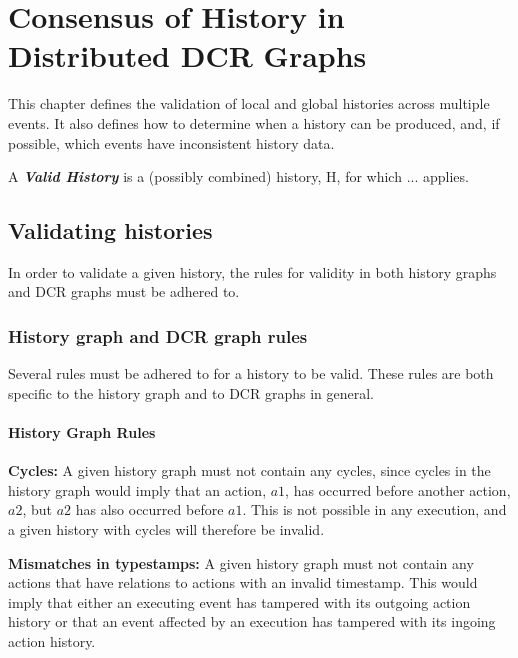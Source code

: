 \chapter{Consensus of History in Distributed DCR Graphs}
\label{chap:consensusindcr}
	This chapter defines the validation of local and global histories across multiple events. It also defines how to determine when a history can be produced, and, if possible, which events have inconsistent history data.
	 
	\begin{definition}
		A \textit{\textbf{Valid History}} is a (possibly combined) history, H, for which ... applies. 
	\end{definition}
	
	\section{Validating histories}
	In order to validate a given history, the rules for validity in both history graphs and DCR graphs must be adhered to. 
	
	\subsection{History graph and DCR graph rules}
	Several rules must be adhered to for a history to be valid. These rules are both specific to the history graph and to DCR graphs in general. 
	
	\subsubsection{History Graph Rules}
	\textbf{Cycles:} A given history graph must not contain any cycles, since cycles in the history graph would imply that an action, $a1$, has occurred before another action, $a2$, but $a2$ has also occurred before $a1$. This is not possible in any execution, and a given history with cycles will therefore be invalid.
	
	\newpar \textbf{Mismatches in typestamps:} A given history graph must not contain any actions that have relations to actions with an invalid timestamp. This would imply that either an executing event has tampered with its outgoing action history or that an event affected by an execution has tampered with its ingoing action history. 
	
	
